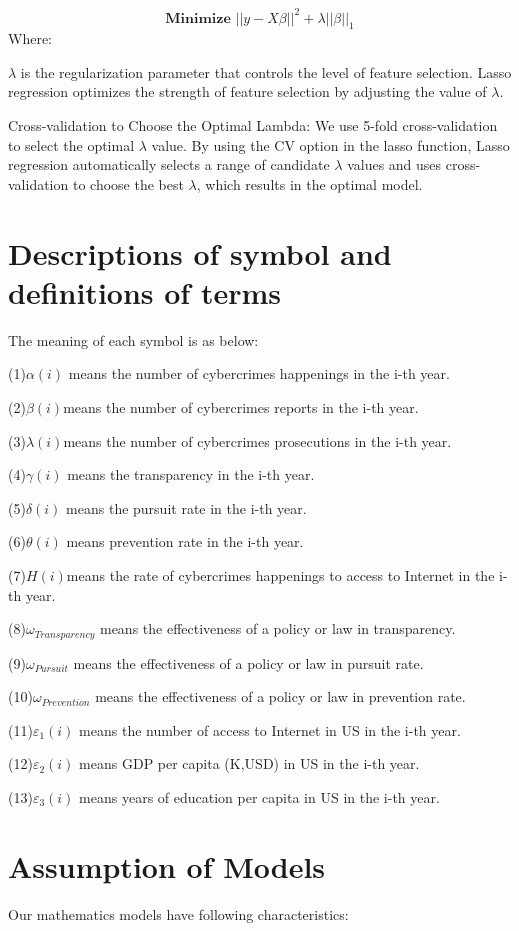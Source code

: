\documentclass[12pt]{article}
\begin{document}
	\[\textbf{Minimize  }  ||y-X\beta||^2+\lambda||\beta||_1\]
	Where:
	
	$\lambda$ is the regularization parameter that controls the level of feature selection. Lasso regression optimizes the strength of feature selection by adjusting the value of $\lambda$.
	
	Cross-validation to Choose the Optimal Lambda: We use 5-fold cross-validation to select the optimal $\lambda$ value. By using the CV option in the lasso function, Lasso regression automatically selects a range of candidate $\lambda$ values and uses cross-validation to choose the best $\lambda$, which results in the optimal model.
	

	
	
	
	\section{Descriptions of symbol and definitions of terms}
	The meaning of each symbol is as below:

	(1)$\alpha(i)$ means the number of cybercrimes happenings in the i-th year.

	(2)$\beta(i)$means the number of cybercrimes reports in the i-th year.

	(3)$\lambda(i)$means the number of cybercrimes prosecutions in the i-th year.

	(4)$\gamma(i)$ means the transparency in the i-th year.

	(5)$\delta(i)$ means the pursuit rate in the i-th year.  

	(6)$\theta(i)$ means prevention rate in the i-th year.

	(7)$H(i)$means the rate of cybercrimes happenings to access to Internet in the i-th year.

	(8)$\omega_{Transparency}$ means the effectiveness of a policy or law in transparency.

	(9)$\omega_{Pursuit}$ means the effectiveness of a policy or law in pursuit rate.

	(10)$\omega_{Prevention}$ means the effectiveness of a policy or law in prevention rate.

	(11)$\varepsilon_1(i)$ means the number of access to Internet in US in the i-th year.

	(12)$\varepsilon_2(i)$ means GDP per capita (K,USD) in US in the i-th year.

	(13)$\varepsilon_3(i)$ means years of education per capita in US in the i-th year.
	\section{Assumption of Models}
	Our mathematics models have following characteristics:
\end{document}
